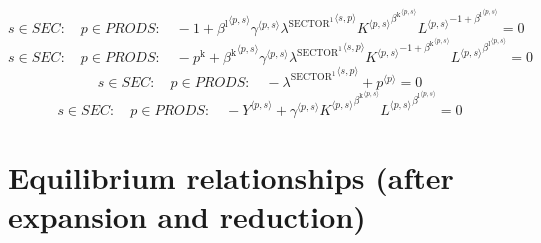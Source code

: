 \begin{equation}
s\in {S\!E\!C}\colon\quad p\in {P\!R\!O\!D\!S}\colon\quad -1 + {{\beta^{\mathrm{l}}}^{\langle p,s\rangle}} {{\gamma}^{\langle p,s\rangle}} {{\lambda^{\mathrm{SECTOR}^{\mathrm{1}}}}^{\langle s,p\rangle}} {{{K}^{\langle p,s\rangle}}^{{\beta^{\mathrm{k}}}^{\langle p,s\rangle}}} {{{L}^{\langle p,s\rangle}}^{-1 + {\beta^{\mathrm{l}}}^{\langle p,s\rangle}}} = 0
\end{equation}
\begin{equation}
s\in {S\!E\!C}\colon\quad p\in {P\!R\!O\!D\!S}\colon\quad -p^{\mathrm{k}} + {{\beta^{\mathrm{k}}}^{\langle p,s\rangle}} {{\gamma}^{\langle p,s\rangle}} {{\lambda^{\mathrm{SECTOR}^{\mathrm{1}}}}^{\langle s,p\rangle}} {{{K}^{\langle p,s\rangle}}^{-1 + {\beta^{\mathrm{k}}}^{\langle p,s\rangle}}} {{{L}^{\langle p,s\rangle}}^{{\beta^{\mathrm{l}}}^{\langle p,s\rangle}}} = 0
\end{equation}
\begin{equation}
s\in {S\!E\!C}\colon\quad p\in {P\!R\!O\!D\!S}\colon\quad -{\lambda^{\mathrm{SECTOR}^{\mathrm{1}}}}^{\langle s,p\rangle} + {p}^{\langle p\rangle} = 0
\end{equation}
\begin{equation}
s\in {S\!E\!C}\colon\quad p\in {P\!R\!O\!D\!S}\colon\quad -{Y}^{\langle p,s\rangle} + {{\gamma}^{\langle p,s\rangle}} {{{K}^{\langle p,s\rangle}}^{{\beta^{\mathrm{k}}}^{\langle p,s\rangle}}} {{{L}^{\langle p,s\rangle}}^{{\beta^{\mathrm{l}}}^{\langle p,s\rangle}}} = 0
\end{equation}



\section{Equilibrium relationships (after expansion and reduction)}

